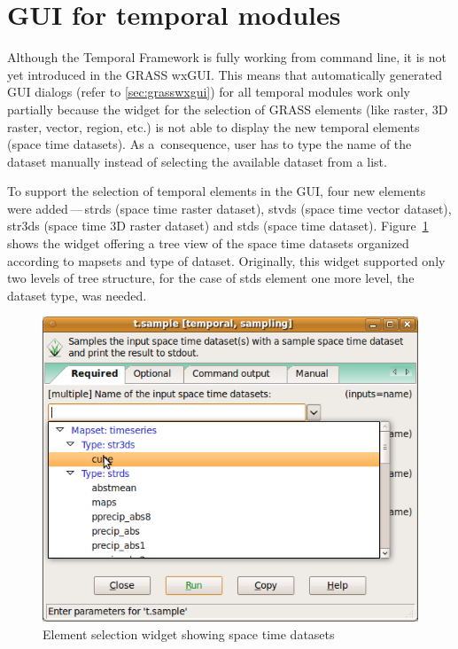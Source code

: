 \documentclass[a4paper,12pt,oneside]{book}
\newcommand{\tf}{Temporal Framework\xspace}
\newcommand{\dash}{\mbox{\,---\,}}
\begin{document}
\section{GUI for temporal modules}
Although the \tf is fully working from command line, it is not yet introduced in the GRASS wxGUI.
This means that automatically generated GUI dialogs (refer to \ref{sec:grasswxgui})
for all temporal modules work only partially because the widget for the selection of GRASS elements
(like raster, 3D raster, vector, region, etc.) is not able to display the new temporal elements
(space time datasets). As a~consequence, user has to type the name of the dataset manually
instead of selecting the available dataset from a list.

To support the selection of temporal elements in the GUI, four new elements were
added\dash strds (space time raster dataset), stvds (space time vector dataset),
str3ds (space time 3D raster dataset) and stds (space time dataset).
Figure~\ref{fig:gselect} shows the widget offering a tree view of the space time datasets
organized according to mapsets and type of dataset.
Originally, this widget supported only two levels of tree structure,
for the case of stds element one more level, the dataset type, was needed.

\begin{figure}[h!]
  \centering
  \includegraphics{./images/gselect.png}
  \caption{Element selection widget showing space time datasets}
  \label{fig:gselect}
\end{figure}
\end{document}

